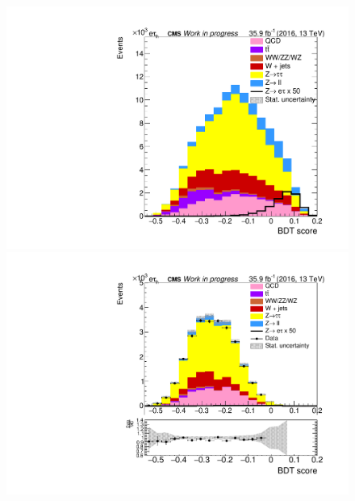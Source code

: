 \begin{figure}[htp]
	\begin{multicols}{2}
		\includegraphics[width=\linewidth]{plots/et/BDTScore.pdf}\par 
		\includegraphics[width=\linewidth]{plots/et/BDTScore_ZTTCR}\par
	\end{multicols}	


\end{figure}

